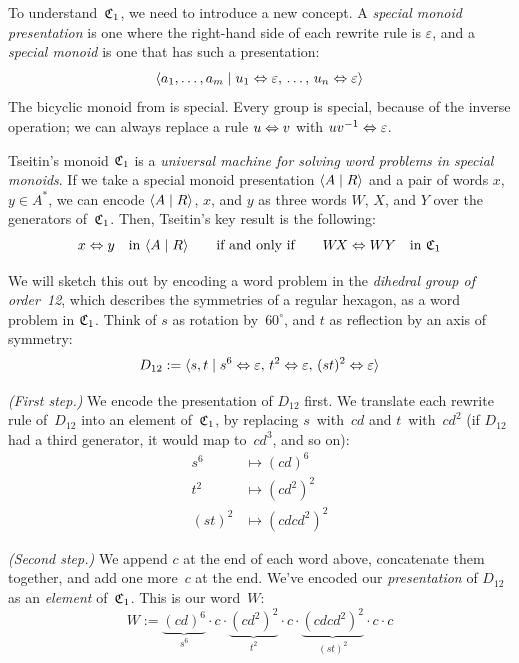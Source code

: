 \documentclass[../generics]{subfiles}
\begin{document}
To understand~$\mathfrak{C}_1$, we need to introduce a new concept. A \emph{special monoid presentation} is one where the right-hand side of each rewrite rule is $\varepsilon$, and a \emph{special monoid} is one that has such a presentation:
\[\langle a_1, \ldots, a_m \mid u_1 \Leftrightarrow \varepsilon,\, \ldots,\, u_n \Leftrightarrow \varepsilon\rangle\]
The bicyclic monoid from  is special. Every group is special, because of the inverse operation; we can always replace a rule $u\Leftrightarrow v$ with $uv^{-1}\Leftrightarrow\varepsilon$.

Tseitin's monoid $\mathfrak{C}_1$ is a \textsl{universal machine for solving word problems in special monoids}. If we take a special monoid presentation $\langle A \mid R\rangle$ and a pair of words $x$, $y\in A^*$, we can encode $\langle A \mid R\rangle$, $x$, and $y$ as three words $W\!$, $X$, and $Y$ over the generators of~$\mathfrak{C}_1$. Then, Tseitin's key result is the following:
\[x\Leftrightarrow y\quad\text{in $\langle A \mid R\rangle$}\qquad \text{if and only if} \qquad W\! X\Leftrightarrow WY \quad \text{in $\mathfrak{C}_1$}\]

We will sketch this out by encoding a word problem in the \emph{dihedral group of order~12}, which describes the symmetries of a regular hexagon, as a word problem in $\mathfrak{C}_1$. Think of $s$ as rotation by~$60^\circ$, and $t$ as reflection by an axis of symmetry:
\[D_{12} := \langle s,t \mid s^6\Leftrightarrow\varepsilon,\, t^2\Leftrightarrow\varepsilon,\, (st)^2\Leftrightarrow \varepsilon\rangle\]

\smallskip

\emph{(First step.)} We encode the presentation of $D_{12}$ first. We translate each rewrite rule of~$D_{12}$ into an element of~$\mathfrak{C}_1$, by replacing $s$~with~$cd$ and $t$~with~$cd^2$ (if $D_{12}$ had a third generator, it would map to~$cd^3$, and so on):
\begin{align*}
s^6 &\mapsto (cd)^6\\
t^2 &\mapsto (cd^2)^2\\
(st)^2 &\mapsto (cdcd^2)^2
\end{align*}

\smallskip

\emph{(Second step.)} We append $c$ at the end of each word above, concatenate them together, and add one more~$c$ at the end. We've encoded our \emph{presentation} of $D_{12}$ as an \emph{element} of~$\mathfrak{C}_1$. This is our word~$W$:
\[
W := \underbrace{(cd)^6}_{s^6}{} \cdot c\cdot \underbrace{(cd^2)^2}_{t^2}{} \cdot c\cdot \underbrace{(cdcd^2)^2}_{(st)^2} {}\cdot c\cdot c
\]
\end{document}
